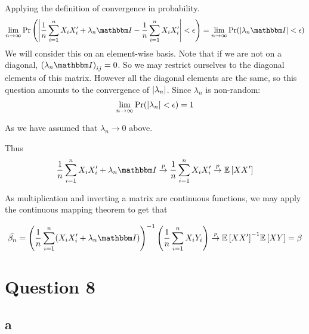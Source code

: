 \documentclass[12pt]{paper}
\begin{document}
Applying the definition of convergence in probability.
\begin{align*}
  \lim_{n\rightarrow\infty} \Pr\left( \abs{ \frac{1}{n} \sum_{i=1}^n X_i X_i' + \lambda_n \eye -
  \frac{1}{n} \sum_{i=1}^n X_i X_i' } < \epsilon\right) &= \lim_{n\rightarrow\infty} \Pr( \abs{ \lambda_n
                                          \eye } < \epsilon)\\
\end{align*}
We will consider this on an element-wise basis. Note that if we are
not on a diagonal, $\left( \lambda_n \eye \right)_{ij} = 0$. So we may
restrict ourselves to the diagonal elements of this matrix. However
all the diagonal elements are the same, so this question amounts to
the convergence of $\left \lvert \lambda_n \right \rvert$. Since $\lambda_n$ is non-random: 
\begin{align*}
  \lim_{n\rightarrow\infty} \Pr( \left \lvert  \lambda_n \right \rvert < \epsilon) = 1
\end{align*}

As we have assumed that $\lambda_n \rightarrow 0$ above.




Thus
\begin{equation*}
  \frac{1}{n} \sum_{i=1}^n X_i X_i' + \lambda_n \eye \plim \frac{1}{n}
  \sum_{i=1}^n X_i X_i' \plim \exV{X X'}
\end{equation*}

As multiplication and inverting a matrix are continuous functions, we
may apply the continuous mapping theorem to get that 

\begin{equation*}
  \tilde{\beta_n} = \inv{ \left( \frac{1}{n} \sum_{i=1}^n ( X_i X_i' + \lambda_n
      \eye) \right)} \left( \frac{1}{n} \sum_{i=1}^n X_i Y_i \right)
  \plim \inv{ \exV{X X'}} \exV{XY} = \beta
\end{equation*}


\section*{Question 8}

\subsection*{a}
\end{document}
